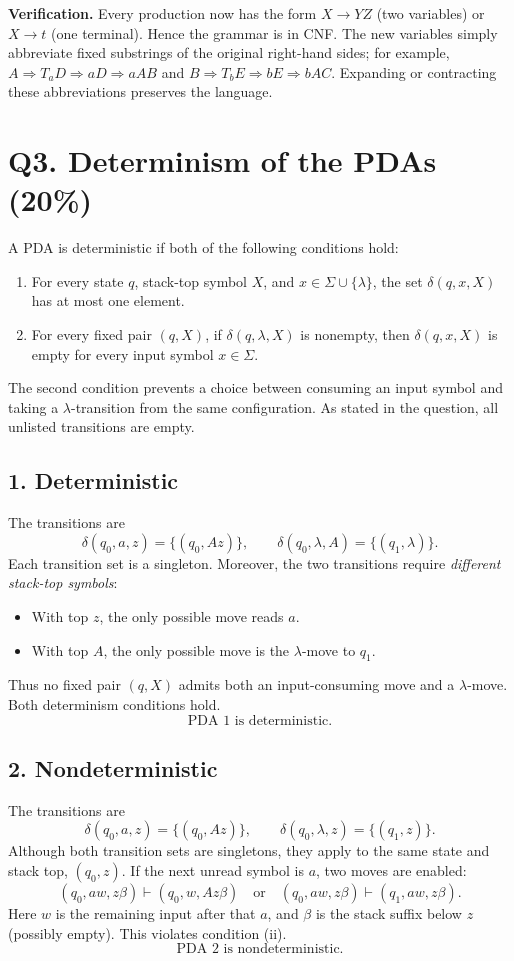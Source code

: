 \documentclass[11pt,a4paper]{article}
\newcommand{\derive}{\Rightarrow}
\begin{document}
\textbf{Verification.}
Every production now has the form $X\to YZ$ (two variables) or
$X\to t$ (one terminal). Hence the grammar is in CNF.
The new variables simply abbreviate fixed substrings of the original
right-hand sides; for example,
$A\derive T_aD\derive aD\derive aAB$ and
$B\derive T_bE\derive bE\derive bAC$.
Expanding or contracting these abbreviations preserves the language.

\newpage
\section*{Q3. Determinism of the PDAs (20\%)}
A PDA is deterministic if both of the following conditions hold:
\begin{enumerate}[label=(\roman*)]
  \item For every state $q$, stack-top symbol $X$, and
  $x\in\Sigma\cup\{\lambda\}$, the set $\delta(q,x,X)$ has at most one element.
  \item For every fixed pair $(q,X)$, if $\delta(q,\lambda,X)$ is nonempty,
  then $\delta(q,x,X)$ is empty for every input symbol $x\in\Sigma$.
\end{enumerate}
The second condition prevents a choice between consuming an input symbol
and taking a $\lambda$-transition from the same configuration.
As stated in the question, all unlisted transitions are empty.

\subsection*{1. Deterministic}
The transitions are
\[
\delta(q_0,a,z)=\{(q_0,Az)\},\qquad
\delta(q_0,\lambda,A)=\{(q_1,\lambda)\}.
\]
Each transition set is a singleton. Moreover, the two transitions require
\emph{different stack-top symbols}:
\begin{itemize}
  \item With top $z$, the only possible move reads $a$.
  \item With top $A$, the only possible move is the $\lambda$-move to $q_1$.
\end{itemize}
Thus no fixed pair $(q,X)$ admits both an input-consuming move and a
$\lambda$-move. Both determinism conditions hold.
\[
\boxed{\text{PDA 1 is deterministic.}}
\]

\subsection*{2. Nondeterministic}
The transitions are
\[
\delta(q_0,a,z)=\{(q_0,Az)\},\qquad
\delta(q_0,\lambda,z)=\{(q_1,z)\}.
\]
Although both transition sets are singletons, they apply to the same
state and stack top, $(q_0,z)$. If the next unread symbol is $a$, two
moves are enabled:
\[
(q_0,aw,z\beta)\vdash(q_0,w,Az\beta)
\quad\text{or}\quad
(q_0,aw,z\beta)\vdash(q_1,aw,z\beta).
\]
Here $w$ is the remaining input after that $a$, and $\beta$ is the stack
suffix below $z$ (possibly empty).
This violates condition (ii).
\[
\boxed{\text{PDA 2 is nondeterministic.}}
\]
\end{document}
